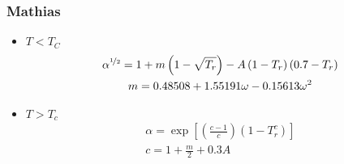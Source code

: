 \subsubsection{Mathias\cite{mathias} }
\begin{itemize}

\item{$T < T_C$}
\begin{gather}
	\alpha^{\nicefrac{1}{2}} = 1 + m \left(1-\sqrt{T_r}\right)- A\left(1-T_r\right)\left(0.7-T_r\right)
	\\
	m = 0.48508+1.55191\omega-0.15613\omega^2
\end{gather}

\item{$T > T_c$}
\begin{gather}
	\alpha = \exp{\left[ \left( \frac{c-1}{c} \right)  \left(  1- T_r^c  \right)  \right]}\\
	c = 1 + \frac{m}{2} + 0.3 A
\end{gather}

 \end{itemize}

